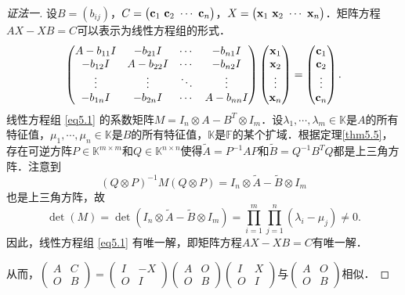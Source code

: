\documentclass[a4paper,fontset=windows]{ctexbook}
\theoremstyle{definition}
\begin{document}
\begin{proof}[证法一]
设$B=(b_{ij})$，$C=\begin{pmatrix}{\bf c}_1~{\bf c}_2~\cdots~{\bf c}_n\end{pmatrix}$，$X=\begin{pmatrix}{\bf x}_1~{\bf x}_2~\cdots~{\bf x}_n\end{pmatrix}$．矩阵方程$AX-XB=C$可以表示为线性方程组的形式．
\begin{equation}\label{eq5.1}
\begin{pmatrix}A-b_{11}I&-b_{21}I&\cdots&-b_{n1}I \\ -b_{12}I&A-b_{22}I&\cdots&-b_{n2}I \\ \vdots&\vdots&\ddots&\vdots \\ -b_{1n}I&-b_{2n}I&\cdots&A-b_{nn}I\end{pmatrix}\begin{pmatrix}{\bf x}_1 \\ {\bf x}_2 \\ \vdots \\ {\bf x}_n\end{pmatrix}=\begin{pmatrix}{\bf c}_1 \\ {\bf c}_2 \\ \vdots \\ {\bf c}_n\end{pmatrix}.
\end{equation}
线性方程组 \eqref{eq5.1} 的系数矩阵$M=I_n\otimes A-B^T\otimes I_m$．设$\lambda_1,\cdots,\lambda_m\in\mathbb{K}$是$A$的所有特征值，$\mu_1,\cdots,\mu_n\in\mathbb{K}$是$B$的所有特征值，$\mathbb{K}$是$\mathbb{F}$的某个扩域．根据定理\ref{thm5.5}，存在可逆方阵$P\in\mathbb{K}^{m\times m}$和$Q\in\mathbb{K}^{n\times n}$使得$\widetilde{A}=P^{-1}AP$和$\widetilde{B}=Q^{-1}B^TQ$都是上三角方阵．注意到
$$(Q\otimes P)^{-1}M(Q\otimes P)=I_n\otimes\widetilde{A}-\widetilde{B}\otimes I_m$$
也是上三角方阵，故
$$\det(M)=\det(I_n\otimes\widetilde{A}-\widetilde{B}\otimes I_m)=\prod_{i=1}^m\prod_{j=1}^n(\lambda_i-\mu_j)\ne 0.$$
因此，线性方程组 \eqref{eq5.1} 有唯一解，即矩阵方程$AX-XB=C$有唯一解．

从而，$\begin{pmatrix}A&C \\ O&B\end{pmatrix}=\begin{pmatrix}I&-X \\ O&I\end{pmatrix}\begin{pmatrix}A&O \\ O&B\end{pmatrix}\begin{pmatrix}I&X \\ O&I\end{pmatrix}$与$\begin{pmatrix}A&O \\ O&B\end{pmatrix}$相似．
\end{proof}
\end{document}
